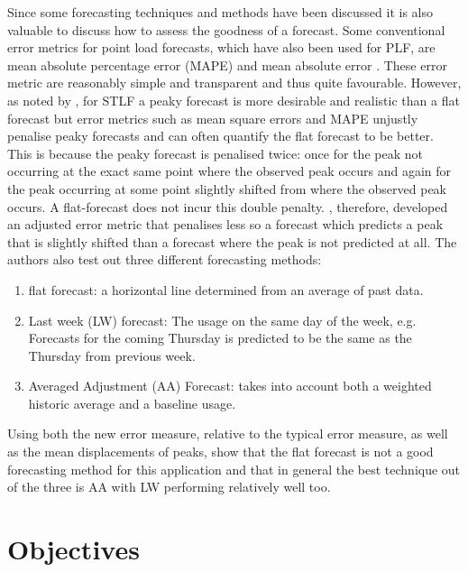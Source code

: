 Since some forecasting techniques and methods have been discussed it is also valuable to discuss how to assess the goodness of a forecast. Some conventional error metrics for point load forecasts, which have also been used for PLF, are mean absolute percentage error (MAPE) and mean absolute error \citep{hong16}. These error metric are reasonably simple and transparent and thus quite favourable. However, as noted by \cite{dan14}, for STLF a peaky forecast is more desirable and realistic than a flat forecast but error metrics such as mean square errors and MAPE unjustly penalise peaky forecasts and can often quantify the flat forecast to be better. This is because the peaky forecast is penalised twice: once for the peak not occurring at the exact same point where the observed peak occurs and again for the peak occurring at some point slightly shifted from where the observed peak occurs. A flat-forecast does not incur this double penalty. \citet{dan14}, therefore, developed an adjusted error metric that penalises less so a forecast which predicts a peak that is slightly shifted than a forecast where the peak is not predicted at all. The authors also test out three different forecasting methods:
\begin{enumerate}
\item flat forecast: a horizontal line determined from an average of past data.
\item Last week (LW) forecast: The usage on the same day of the week, e.g. Forecasts for the coming Thursday is predicted to be the same as the Thursday from previous week.
\item Averaged Adjustment (AA) Forecast: takes into account both a weighted historic average and a baseline usage.
\end{enumerate}

Using both the new error measure, relative to the typical error measure, as well as the mean displacements of peaks, \cite{dan14} show that the flat forecast is not a good forecasting method for this application and that in general the best technique out of the three is AA with LW performing relatively well too.


\section{Objectives} \label{subsec:objectives}

